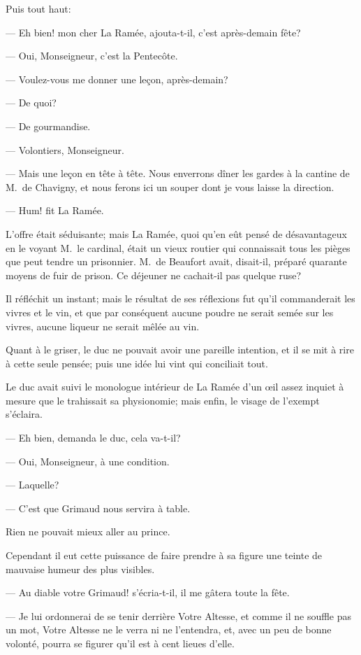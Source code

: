 Puis tout haut:

— Eh bien! mon cher La Ramée, ajouta-t-il, c'est après-demain fête?

— Oui, Monseigneur, c'est la Pentecôte.

— Voulez-vous me donner une leçon, après-demain?

— De quoi?

— De gourmandise.

— Volontiers, Monseigneur.

— Mais une leçon en tête à tête. Nous enverrons dîner les gardes à la cantine de M.~de Chavigny, et nous ferons ici un souper dont je vous laisse la direction.

— Hum! fit La Ramée.

L'offre était séduisante; mais La Ramée, quoi qu'en eût pensé de désavantageux en le voyant M.~le cardinal, était un vieux routier qui connaissait tous les pièges que peut tendre un prisonnier. M.~de Beaufort avait, disait-il, préparé quarante moyens de fuir de prison. Ce déjeuner ne cachait-il pas quelque ruse?

Il réfléchit un instant; mais le résultat de ses réflexions fut qu'il commanderait les vivres et le vin, et que par conséquent aucune poudre ne serait semée sur les vivres, aucune liqueur ne serait mêlée au vin.

Quant à le griser, le duc ne pouvait avoir une pareille intention, et il se mit à rire à cette seule pensée; puis une idée lui vint qui conciliait tout.

Le duc avait suivi le monologue intérieur de La Ramée d'un œil assez inquiet à mesure que le trahissait sa physionomie; mais enfin, le visage de l'exempt s'éclaira.

— Eh bien, demanda le duc, cela va-t-il?

— Oui, Monseigneur, à une condition.

— Laquelle?

— C'est que Grimaud nous servira à table.

Rien ne pouvait mieux aller au prince.

Cependant il eut cette puissance de faire prendre à sa figure une teinte de mauvaise humeur des plus visibles.

— Au diable votre Grimaud! s'écria-t-il, il me gâtera toute la fête.

— Je lui ordonnerai de se tenir derrière Votre Altesse, et comme il ne souffle pas un mot, Votre Altesse ne le verra ni ne l'entendra, et, avec un peu de bonne volonté, pourra se figurer qu'il est à cent lieues d'elle.

